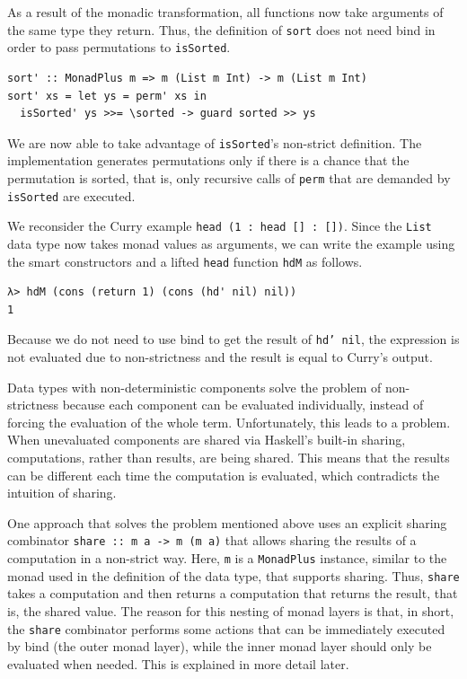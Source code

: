 \documentclass[a4paper, 11pt, fleqn, twoside, abstract=on]{scrreprt}
\newcommand{\hinl}[1]{\texttt{#1}}
\newcommand{\cinl}[1]{\texttt{#1}}
\begin{document}
As a result of the monadic transformation, all functions now take arguments of the same type they return.
Thus, the definition of \hinl{sort} does not need bind in order to pass permutations to \hinl{isSorted}.

\begin{verbatim}
sort' :: MonadPlus m => m (List m Int) -> m (List m Int)
sort' xs = let ys = perm' xs in
  isSorted' ys >>= \sorted -> guard sorted >> ys
\end{verbatim}

We are now able to take advantage of \hinl{isSorted}'s non-strict definition.
The implementation generates permutations only if there is a chance that the permutation is sorted, that is, only recursive calls of \hinl{perm} that are demanded by \hinl{isSorted} are executed.

We reconsider the Curry example \hinl{head (1 : head [] : [])}.
Since the \hinl{List} data type now takes monad values as arguments, we can write the example using the smart constructors and a lifted \hinl{head} function \cinl{hdM} as follows.

\begin{verbatim}
λ> hdM (cons (return 1) (cons (hd' nil) nil))
1
\end{verbatim}
\noindent
Because we do not need to use bind to get the result of \hinl{hd' nil}, the expression is not evaluated due to non-strictness and the result is equal to Curry's output.

Data types with non-deterministic components solve the problem of non-strictness because each component can be evaluated individually, instead of forcing the evaluation of the whole term.
Unfortunately, this leads to a problem.
\label{sec:sharingComputations}
When unevaluated components are shared via Haskell's built-in sharing, computations, rather than results, are being shared.
This means that the results can be different each time the computation is evaluated, which contradicts the intuition of sharing.

One approach that solves the problem mentioned above uses an explicit sharing combinator \hinl{share :: m a -> m (m a)} that allows sharing the results of a computation in a non-strict way.
Here, \hinl{m} is a \hinl{MonadPlus} instance, similar to the monad used in the definition of the data type, that supports sharing.
Thus, \hinl{share} takes a  computation and then returns a computation that returns the result, that is, the shared value.
The reason for this nesting of monad layers is that, in short, the \hinl{share} combinator performs some actions that can be immediately executed by bind (the outer monad layer), while the inner monad layer should only be evaluated when needed.
This is explained in more detail later.
\end{document}
